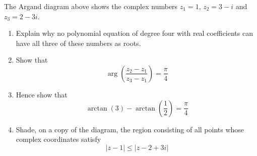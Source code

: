 \documentclass[leqno]{article}
\begin{document}
\begin{enumerate}[
  label=\textbf{\arabic*.},
  leftmargin=*,
  topsep=0pt,
  partopsep=0pt,
  parsep=0pt
]
The Argand diagram above shows the complex numbers $z_1=1$, $z_2=3-i$ and $z_3=2-3i$. \\
\begin{enumerate}[label=\textbf{(\alph*)}]
\item Explain why no polynomial equation of degree four with real coefficients can have all three of these numbers as roots.  \\
\item Show that
\[
\arg\left(\frac{z_2-z_1}{z_3-z_1}\right)=\frac{\pi}{4}
\] 
\item Hence show that
\[
\arctan(3)-\arctan\left(\frac{1}{2}\right)=\frac{\pi}{4}
\] 
\item Shade, on a copy of the diagram, the region consisting of all points whose complex coordinates satisfy
\[
|z-1|\leq |z-2+3i|
\] 
\end{enumerate}

\end{enumerate}
\end{document}
